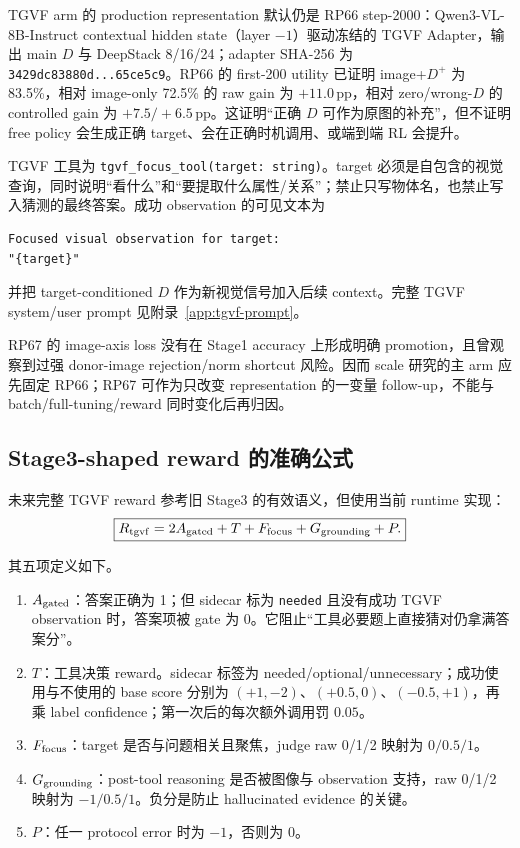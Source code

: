 \documentclass[UTF8,twocolumn,10pt,a4paper]{ctexart}
\newcommand{\TGVF}{\textsf{TGVF}}
\newcommand{\code}[1]{\texttt{#1}}
\newcommand{\pp}{\,\mathrm{pp}}
\newcommand{\Rtgvf}{R_{\mathrm{tgvf}}}
\begin{document}
\TGVF{} arm 的 production representation 默认仍是 RP66 step-2000：Qwen3-VL-8B-Instruct contextual hidden state（layer $-1$）驱动冻结的 TGVF Adapter，输出 main $D$ 与 DeepStack 8/16/24；adapter SHA-256 为 \code{3429dc83880d...65ce5c9}。RP66 的 first-200 utility 已证明 image+$D^+$ 为 83.5\%，相对 image-only 72.5\% 的 raw gain 为 $+11.0\pp$，相对 zero/wrong-$D$ 的 controlled gain 为 $+7.5/+6.5\pp$。这证明“正确 $D$ 可作为原图的补充”，但不证明 free policy 会生成正确 target、会在正确时机调用、或端到端 RL 会提升。

\TGVF{} 工具为 \code{tgvf\_focus\_tool(target: string)}。target 必须是自包含的视觉查询，同时说明“看什么”和“要提取什么属性/关系”；禁止只写物体名，也禁止写入猜测的最终答案。成功 observation 的可见文本为
\begin{Verbatim}[breaklines=true,breakanywhere=true,fontsize=\scriptsize]
Focused visual observation for target:
"{target}"
\end{Verbatim}
并把 target-conditioned $D$ 作为新视觉信号加入后续 context。完整 TGVF system/user prompt 见附录~\ref{app:tgvf-prompt}。

RP67 的 image-axis loss 没有在 Stage1 accuracy 上形成明确 promotion，且曾观察到过强 donor-image rejection/norm shortcut 风险。因而 scale 研究的主 arm 应先固定 RP66；RP67 可作为只改变 representation 的一变量 follow-up，不能与 batch/full-tuning/reward 同时变化后再归因。

\subsection{Stage3-shaped reward 的准确公式}

未来完整 \TGVF{} reward 参考旧 Stage3 的有效语义，但使用当前 runtime 实现：
\begin{equation}
\boxed{\Rtgvf=2A_{\rm gated}+T+F_{\rm focus}+G_{\rm grounding}+P.}
\label{eq:tgvf}
\end{equation}

其五项定义如下。
\begin{enumerate}
  \item $A_{\rm gated}$：答案正确为 1；但 sidecar 标为 \code{needed} 且没有成功 \TGVF{} observation 时，答案项被 gate 为 0。它阻止“工具必要题上直接猜对仍拿满答案分”。
  \item $T$：工具决策 reward。sidecar 标签为 needed/optional/unnecessary；成功使用与不使用的 base score 分别为 $(+1,-2)$、$(+0.5,0)$、$(-0.5,+1)$，再乘 label confidence；第一次后的每次额外调用罚 $0.05$。
  \item $F_{\rm focus}$：target 是否与问题相关且聚焦，judge raw 0/1/2 映射为 $0/0.5/1$。
  \item $G_{\rm grounding}$：post-tool reasoning 是否被图像与 observation 支持，raw 0/1/2 映射为 $-1/0.5/1$。负分是防止 hallucinated evidence 的关键。
  \item $P$：任一 protocol error 时为 $-1$，否则为 0。
\end{enumerate}
\end{document}
